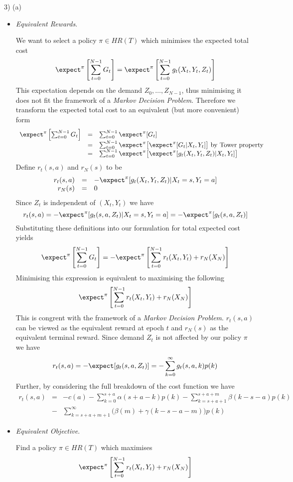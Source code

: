 \documentclass[11pt,a4paper]{article}
\begin{document}
\begin{answer}{3) (a)}
\begin{itemize}
    \item \textit{Equivalent Rewards}.
    \par We want to select a policy $\pi\in HR(T)$ which minimises the expected total cost
    \[ \expect^\pi\left[\sum_{t=0}^{N-1}G_t\right]=\expect^\pi\left[\sum_{t=0}^{N-1}g_t(X_t,Y_t,Z_t)\right] \]
    This expectation depends on the demand $Z_0,\dots,Z_{N-1}$, thus minimising it does not fit the framework of a \textit{Markov Decision Problem}. Therefore we transform the expected total cost to an equivalent (but more convenient) form
    \[\begin{array}{rcl}
      \expect^\pi\left[\sum_{t=0}^{N-1}G_t\right]&=&\sum_{t=0}^{N-1}\expect^\pi[G_t]\\
      &=&\sum_{t=0}^{N-1}\expect^\pi\big[\expect^\pi[G_t|X_t,Y_t]\big]\text{ by Tower property}\\
      &=&\sum_{t=0}^{N-1}\expect^\pi\big[\expect^\pi[g_t(X_t,Y_t,Z_t)|X_t,Y_t]\big]
    \end{array}\]
    Define $r_t(s,a)$ and $r_N(s)$ to be
    \[\begin{array}{rcl}
      r_t(s,a)&=&-\expect^\pi[g_t(X_t,Y_t,Z_t)|X_t=s,Y_t=a]\\
      r_N(s)&=&0
    \end{array}\]
    Since $Z_t$ is independent of $(X_t,Y_t)$ we have
    \[ r_t(s,a)=-\expect^\pi[g_t(s,a,Z_t)|X_t=s,Y_t=a]=-\expect^\pi[g_t(s,a,Z_t)] \]
    Substituting these definitions into our formulation for total expected cost yields
    \[ \expect^\pi\left[\sum_{t=0}^{N-1}G_t\right]=-\expect^\pi\left[\sum_{t=0}^{N-1}r_t(X_t,Y_t)+r_N(X_N)\right] \]
    Minimising this expression is equivalent to maximising the following
    \[ \expect^\pi\left[\sum_{t=0}^{N-1}r_t(X_t,Y_t)+r_N(X_N)\right] \]
    This is congrent with the framework of a \textit{Markov Decision Problem}. $r_t(s,a)$ can be viewed as the equivalent reward at epoch $t$ and $r_N(s)$ as the equivalent terminal reward.
    Since demand $Z_t$ is not affected by our policy $\pi$ we have
    \[ r_t(s,a)=-\expect[g_t(s,a,Z_t)]=-\sum_{k=0}^\infty g_t(s,a,k)p(k) \]
    Further, by considering the full breakdown of the cost function we have
    \[\begin{array}{rcl}
      r_t(s,a)&=&-c(a)-\sum_{k=0}^{s+a}\alpha(s+a-k)p(k)-\sum_{k=s+a+1}^{s+a+m}\beta(k-s-a)p(k)\\
      &-&\sum_{k=s+a+m+1}^\infty\big(\beta(m)+\gamma(k-s-a-m)\big)p(k)
    \end{array}\]

    \item \textit{Equivalent Objective}.
    \par Find a policy $\pi\in HR(T)$ which maximises
    \[ \expect^\pi\left[\sum_{t=0}^{N-1}r_t(X_t,Y_t)+r_N(X_N)\right] \]
  \end{itemize}

\end{answer}
\end{document}
